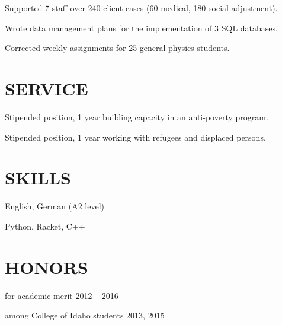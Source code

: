 \documentclass[margin]{res}
\begin{document}
\begin{resume}
\begin{details}
\item{Supported 7 staff over 240 client cases (60 medical, 180 social adjustment).}
\item{Wrote data management plans for the implementation of 3 SQL databases.}
\end{details}

\begin{details}
\item{Corrected weekly assignments for 25 general physics students.}
\end{details} 

\section{SERVICE}

\begin{details}
\item{Stipended position, 1 year building capacity in an anti-poverty program.}
\end{details}

\begin{details}
\item{Stipended position, 1 year working with refugees and displaced persons.}
\end{details}

\section{SKILLS}
\vspace{0pt}
\begin{multicols}{2} \parskip=0pt
\begin{details}
\item English, German (A2 level)
\end{details}
\begin{details}
\item Python, Racket, C++
\end{details}
\end{multicols}

\section{HONORS} \vspace{10pt}

\begin{description}[noitemsep,topsep=0pt]
\item[Heritage Scholarship] for academic merit \hfill 2012 -- 2016
\item[Top Putnam Score] among College of Idaho students \hfill 2013, 2015
\end{description}

\end{resume}
\end{document}
